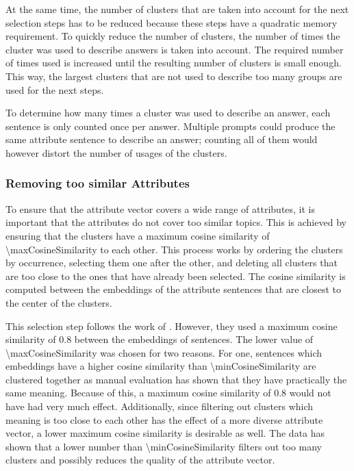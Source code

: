 At the same time, the number of clusters that are taken into account for the next selection steps has to be reduced because these steps have a quadratic memory requirement. To quickly reduce the number of clusters, the number of times the cluster was used to describe answers is taken into account. The required number of times used is increased until the resulting number of clusters is small enough. This way, the largest clusters that are not used to describe too many groups are used for the next steps.

To determine how many times a cluster was used to describe an answer, each sentence is only counted once per answer. Multiple prompts could produce the same attribute sentence to describe an answer; counting all of them would however distort the number of usages of the clusters.

\subsubsection{Removing too similar Attributes}
\label{sec:experiments:setup:selection:removeSimilar}
To ensure that the attribute vector covers a wide range of attributes, it is important that the attributes do not cover too similar topics. This is achieved by ensuring that the clusters have a maximum cosine similarity of \num{\maxCosineSimilarity} to each other. This process works by ordering the clusters by occurrence, selecting them one after the other, and deleting all clusters that are too close to the ones that have already been selected.
The cosine similarity is computed between the embeddings of the attribute sentences that are closest to the center of the clusters.

This selection step follows the work of \citet{patelLearningInterpretableStyle2023}. However, they used a maximum cosine similarity of \num{0.8} between the embeddings of sentences. The lower value of \num{\maxCosineSimilarity} was chosen for two reasons. For one, sentences which embeddings have a higher cosine similarity than \num{\minCosineSimilarity} are clustered together as manual evaluation has shown that they have practically the same meaning. Because of this, a maximum cosine similarity of \num{0.8} would not have had very much effect. Additionally, since filtering out clusters which meaning is too close to each other has the effect of a more diverse attribute vector, a lower maximum cosine similarity is desirable as well. The data has shown that a lower number than \num{\minCosineSimilarity} filters out too many clusters and possibly reduces the quality of the attribute vector. %


